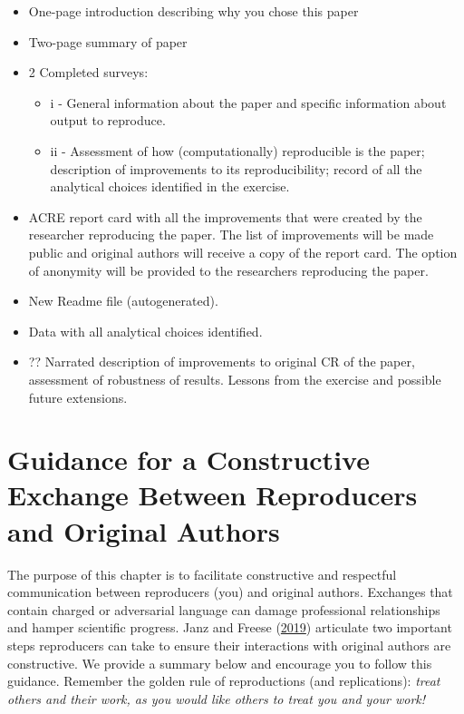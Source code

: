 \documentclass[]{book}
\providecommand{\tightlist}{%
  \setlength{\itemsep}{0pt}\setlength{\parskip}{0pt}}
\begin{document}
\begin{itemize}
\item
  One-page introduction describing why you chose this paper
\item
  Two-page summary of paper
\item
  2 Completed surveys:

  \begin{itemize}
  \tightlist
  \item
    i - General information about the paper and specific
    information about output to reproduce.\\
  \item
    ii - Assessment of how (computationally) reproducible is the paper;
    description of improvements to its reproducibility; record of all the
    analytical choices identified in the exercise.
  \end{itemize}
\item
  ACRE report card with all the improvements that were created by the researcher reproducing the paper. The list of improvements will be made public and original authors will receive a copy of the report card. The option of anonymity will be provided to the researchers reproducing the paper.
\item
  New Readme file (autogenerated).
\item
  Data with all analytical choices identified.
\item
  ?? Narrated description of improvements to original CR of the paper, assessment of robustness of results. Lessons from the exercise and possible future extensions.
\end{itemize}

\hypertarget{guidance-for-a-constructive-exchange-between-reproducers-and-original-authors}{%
\chapter{Guidance for a Constructive Exchange Between Reproducers and Original Authors}\label{guidance-for-a-constructive-exchange-between-reproducers-and-original-authors}}

The purpose of this chapter is to facilitate constructive and respectful communication between reproducers (you) and original authors. Exchanges that contain charged or adversarial language can damage professional relationships and hamper scientific progress. Janz and Freese (\href{https://www.mzes.uni-mannheim.de/openscience/wp-content/uploads/2019/01/Janz-Freese_-Good-and-Bad-Replications-1.pdf}{2019}) articulate two important steps reproducers can take to ensure their interactions with original authors are constructive. We provide a summary below and encourage you to follow this guidance. Remember the golden rule of reproductions (and replications): \emph{treat others and their work, as you would like others to treat you and your work!}
\end{document}
